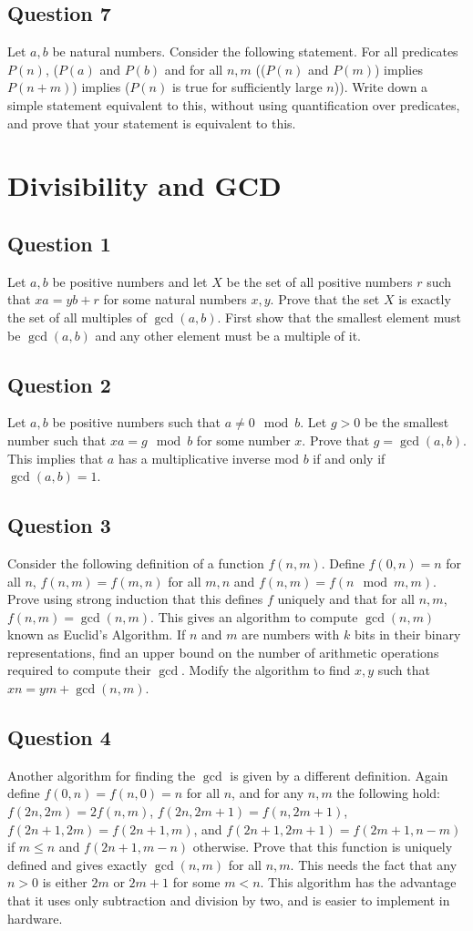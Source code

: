 \documentclass[12pt]{report}
\begin{document}
\section*{Question 7}
Let $a, b$ be natural numbers. Consider the following statement. For all predicates $P(n)$, ($P(a)$ and $P(b)$ and for all $n, m$ (($P(n)$ and $P(m)$) implies $P(n + m)$) implies ($P(n)$ is true for sufficiently large $n$)).  Write down a simple statement equivalent to this, without using quantification over predicates, and prove that your statement is equivalent to this.
\chapter{Divisibility and GCD}
\section*{Question 1}
Let $a, b$ be positive numbers and let $X$ be the set of all positive numbers $r$ such that $xa = yb + r$ for some natural numbers $x, y$. Prove that the set $X$ is exactly the set of all multiples of $\gcd(a, b)$. First show that the smallest element must be $\gcd(a, b)$ and any other element must be a multiple of it.
\section*{Question 2}
Let $a, b$ be positive numbers such that $a \neq 0 \mod b$. Let $g > 0$ be the smallest number such that $xa = g \mod b$ for some number $x$. Prove that $g = \gcd(a, b)$. This implies that $a$ has a multiplicative inverse mod $b$ if and only if $\gcd(a, b) = 1$.
\section*{Question 3}
Consider the following definition of a function $f(n, m)$. Define $f(0, n) = n$ for all $n$, $f(n, m) = f(m, n)$ for all $m, n$ and $f(n, m) = f(n \mod m, m)$. Prove using strong induction that this defines $f$ uniquely and that for all $n, m$, $f(n, m) = \gcd(n, m)$. This gives an algorithm to compute $\gcd(n, m)$ known as Euclid's Algorithm. If $n$ and $m$ are numbers with $k$ bits in their binary representations, find an upper bound on the number of arithmetic operations required to compute their $\gcd$. Modify the algorithm to find $x, y$ such that $xn = ym + \gcd(n, m)$.
\section*{Question 4}
Another algorithm for finding the $\gcd$ is given by a different definition. Again define $f(0, n) = f(n, 0) = n$ for all $n$, and for any $n, m$ the following hold: $f(2n, 2m) = 2f(n, m)$, $f(2n, 2m + 1) = f(n, 2m + 1)$, $f(2n + 1, 2m) = f(2n + 1, m)$, and $f(2n + 1, 2m + 1) = f(2m + 1, n - m)$ if $m \leq n$ and $f(2n + 1, m - n)$ otherwise. Prove that this function is uniquely defined and gives exactly $\gcd(n, m)$ for all $n, m$. This needs the fact that any $n > 0$ is either $2m$ or $2m + 1$ for some $m < n$. This algorithm has the advantage that it uses only subtraction and division by two, and is easier to implement in hardware.
\end{document}
